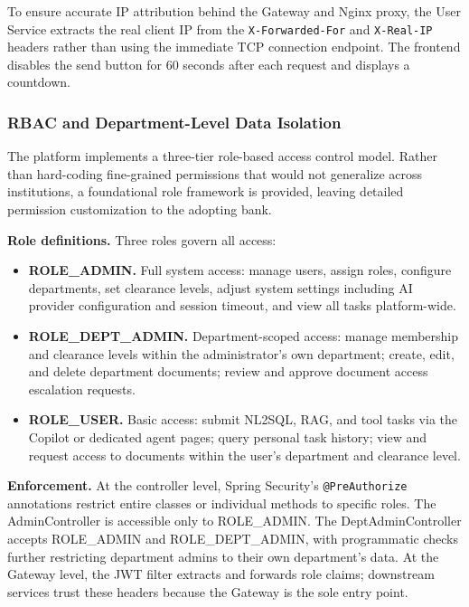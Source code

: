 To ensure accurate IP attribution behind the Gateway and Nginx proxy, the User Service extracts the real client IP from the \texttt{X-Forwarded-For} and \texttt{X-Real-IP} headers rather than using the immediate TCP connection endpoint. The frontend disables the send button for 60 seconds after each request and displays a countdown.

\subsubsection{RBAC and Department-Level Data Isolation}

The platform implements a three-tier role-based access control model. Rather than hard-coding fine-grained permissions that would not generalize across institutions, a foundational role framework is provided, leaving detailed permission customization to the adopting bank.

\textbf{Role definitions.} Three roles govern all access:

\begin{itemize}
  \item \textbf{ROLE\_ADMIN.} Full system access: manage users, assign roles, configure departments, set clearance levels, adjust system settings including AI provider configuration and session timeout, and view all tasks platform-wide.
  \item \textbf{ROLE\_DEPT\_ADMIN.} Department-scoped access: manage membership and clearance levels within the administrator's own department; create, edit, and delete department documents; review and approve document access escalation requests.
  \item \textbf{ROLE\_USER.} Basic access: submit NL2SQL, RAG, and tool tasks via the Copilot or dedicated agent pages; query personal task history; view and request access to documents within the user's department and clearance level.
\end{itemize}

\textbf{Enforcement.} At the controller level, Spring Security's \texttt{@PreAuthorize} annotations restrict entire classes or individual methods to specific roles. The AdminController is accessible only to ROLE\_ADMIN. The DeptAdminController accepts ROLE\_ADMIN and ROLE\_DEPT\_ADMIN, with programmatic checks further restricting department admins to their own department's data. At the Gateway level, the JWT filter extracts and forwards role claims; downstream services trust these headers because the Gateway is the sole entry point.

